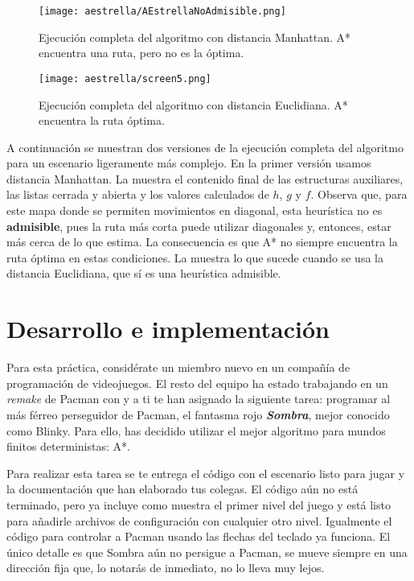 \begin{figure}[h!]
  \centering
  \texttt{[image: aestrella/AEstrellaNoAdmisible.png]}
  \caption{Ejecución completa del algoritmo con distancia Manhattan. A* encuentra una ruta, pero no es la óptima.}
  \label{fig:NoAdmisible}
\end{figure}

\begin{figure}[h!]
  \centering
  \texttt{[image: aestrella/screen5.png]}
  \caption{Ejecución completa del algoritmo con distancia Euclidiana.  A* encuentra la ruta óptima.}
  \label{fig:fig4P4}
\end{figure}


A continuación se muestran dos versiones de la ejecución completa del algoritmo para un escenario ligeramente más complejo.  En la primer versión usamos distancia Manhattan.  La  muestra el contenido final de las estructuras auxiliares, las listas cerrada y abierta y los valores calculados de $h$, $g$ y $f$.  Observa que, para este mapa donde se permiten movimientos en diagonal, esta heurística no es \textbf{admisible}, pues la ruta más corta puede utilizar diagonales y, entonces, estar más cerca de lo que estima.  La consecuencia es que A* no siempre encuentra la ruta óptima en estas condiciones.  La  muestra lo que sucede cuando se usa la distancia Euclidiana, que sí es una heurística admisible.


\section{Desarrollo e implementaci\'on}

Para esta práctica, considérate un miembro nuevo en un compañía de programación de videojuegos.  El resto del equipo ha estado trabajando en un \textit{remake} de Pacman con  y a ti te han asignado la siguiente tarea: programar al más férreo perseguidor de Pacman, el fantasma rojo \textbf{\textit{Sombra}}, mejor conocido como Blinky. Para ello, has decidido utilizar el mejor algoritmo para mundos finitos deterministas: A*.

Para realizar esta tarea se te entrega el código con el escenario listo para jugar y la documentación que han elaborado tus colegas.  El código aún no está terminado, pero ya incluye como muestra el primer nivel del juego y está listo para añadirle archivos de configuración con cualquier otro nivel.  Igualmente el código para controlar a Pacman usando las flechas del teclado ya funciona.  El único detalle es que Sombra aún no persigue a Pacman, se mueve siempre en una dirección fija que, lo notarás de inmediato, no lo lleva muy lejos.

